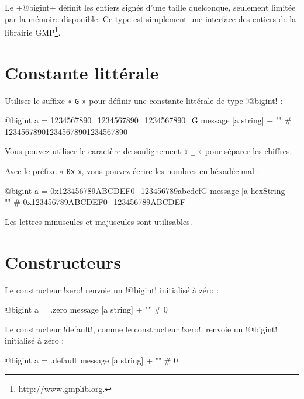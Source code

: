 

Le \ggs+@bigint+ définit les entiers signés d'une taille quelconque, seulement limitée par la mémoire disponible. Ce type est simplement une interface des entiers de la librairie GMP\footnote{\url{http://www.gmplib.org}.}.

\section{Constante littérale}

Utiliser le suffixe « \texttt{G} » pour définir une constante littérale de type \ggs!@bigint! :
\begin{galgas}
@bigint a = 1234567890_1234567890_1234567890_G
message [a string] + "\n" # 123456789012345678901234567890
\end{galgas}

Vous pouvez utiliser le caractère de soulignement « \texttt{\_} » pour séparer les chiffres.

Avec le préfixe « \texttt{0x} », vous pouvez écrire les nombres en héxadécimal :
\begin{galgas}
@bigint a = 0x123456789ABCDEF0_123456789abcdefG
message [a hexString] + "\n" # 0x123456789ABCDEF0_123456789ABCDEF
\end{galgas}

Les lettres minuscules et majuscules sont utilisables.

\section{Constructeurs}


Le constructeur \ggs!zero! renvoie un \ggs!@bigint! initialisé à zéro :
\begin{galgas}
@bigint a = .zero
message [a string] + "\n" # 0
\end{galgas}




Le constructeur \ggs!default!, comme le constructeur \ggs!zero!, renvoie un \ggs!@bigint! initialisé à zéro :
\begin{galgas}
@bigint a = .default
message [a string] + "\n" # 0
\end{galgas}


